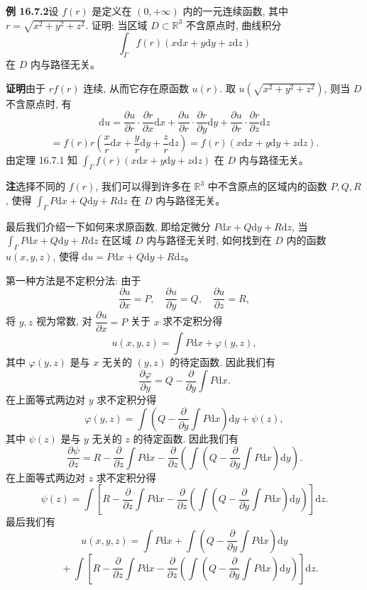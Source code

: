 \documentclass[UTF8, 12pt, fontset=fandol, oneside]{ctexart}
\begin{document}
\noindent\textbf{例 16.7.2}\quad 设 $f(r)$ 是定义在 $(0,+\infty)$ 内的一元连续函数, 其中 $r=\sqrt{x^2+y^2+z^2}$. 证明: 当区域 $D\subset\mathbb R^3$ 不含原点时, 曲线积分
\[
  \int_\Gamma f(r)(x\mathrm dx+y\mathrm dy+z\mathrm dz)
\]
在 $D$ 内与路径无关。

\noindent\textbf{证明}\quad 由于 $rf(r)$ 连续, 从而它存在原函数 $u(r)$. 取 $u(\sqrt{x^2+y^2+z^2})$, 则当 $D$ 不含原点时, 有
\[
  \mathrm du
  =\frac{\partial u}{\partial r}\cdot\frac{\partial r}{\partial x}\mathrm dx
  +\frac{\partial u}{\partial r}\cdot\frac{\partial r}{\partial y}\mathrm dy
  +\frac{\partial u}{\partial r}\cdot\frac{\partial r}{\partial z}\mathrm dz
\]
\[
  =f(r)r\left(\frac{x}{r}\mathrm dx+\frac{y}{r}\mathrm dy+\frac{z}{r}\mathrm dz\right)
  =f(r)(x\mathrm dx+y\mathrm dy+z\mathrm dz).
\]
由定理 16.7.1 知 $\int_\Gamma f(r)(x\mathrm dx+y\mathrm dy+z\mathrm dz)$ 在 $D$ 内与路径无关。

\noindent\textbf{注}\quad 选择不同的 $f(r)$, 我们可以得到许多在 $\mathbb R^3$ 中不含原点的区域内的函数 $P,Q,R$, 使得 $\int_\Gamma P\mathrm dx+Q\mathrm dy+R\mathrm dz$ 在 $D$ 内与路径无关。

最后我们介绍一下如何来求原函数, 即给定微分 $P\mathrm dx+Q\mathrm dy+R\mathrm dz$, 当 $\int_\Gamma P\mathrm dx+Q\mathrm dy+R\mathrm dz$ 在区域 $D$ 内与路径无关时, 如何找到在 $D$ 内的函数 $u(x,y,z)$, 使得 $\mathrm du=P\mathrm dx+Q\mathrm dy+R\mathrm dz$。

第一种方法是不定积分法: 由于
\[
  \frac{\partial u}{\partial x}=P,\quad
  \frac{\partial u}{\partial y}=Q,\quad
  \frac{\partial u}{\partial z}=R,
\]
将 $y,z$ 视为常数, 对 $\dfrac{\partial u}{\partial x}=P$ 关于 $x$ 求不定积分得
\[
  u(x,y,z)=\int P\mathrm dx+\varphi(y,z),
\]
其中 $\varphi(y,z)$ 是与 $x$ 无关的 $(y,z)$ 的待定函数. 因此我们有
\[
  \frac{\partial\varphi}{\partial y}
  =Q-\frac{\partial}{\partial y}\int P\mathrm dx.
\]
在上面等式两边对 $y$ 求不定积分得
\[
  \varphi(y,z)=\int\left(Q-\frac{\partial}{\partial y}\int P\mathrm dx\right)\mathrm dy+\psi(z),
\]
其中 $\psi(z)$ 是与 $y$ 无关的 $z$ 的待定函数. 因此我们有
\[
  \frac{\partial\psi}{\partial z}
  =
  R-\frac{\partial}{\partial z}\int P\mathrm dx
  -\frac{\partial}{\partial z}
  \left(\int\left(Q-\frac{\partial}{\partial y}\int P\mathrm dx\right)\mathrm dy\right).
\]
在上面等式两边对 $z$ 求不定积分得
\[
  \psi(z)=\int\left[
  R-\frac{\partial}{\partial z}\int P\mathrm dx
  -\frac{\partial}{\partial z}
  \left(\int\left(Q-\frac{\partial}{\partial y}\int P\mathrm dx\right)\mathrm dy\right)
  \right]\mathrm dz.
\]
最后我们有
\[
  u(x,y,z)=\int P\mathrm dx
  +\int\left(Q-\frac{\partial}{\partial y}\int P\mathrm dx\right)\mathrm dy
\]
\[
  \quad+\int\left[
  R-\frac{\partial}{\partial z}\int P\mathrm dx
  -\frac{\partial}{\partial z}
  \left(\int\left(Q-\frac{\partial}{\partial y}\int P\mathrm dx\right)\mathrm dy\right)
  \right]\mathrm dz.
\]
\end{document}
